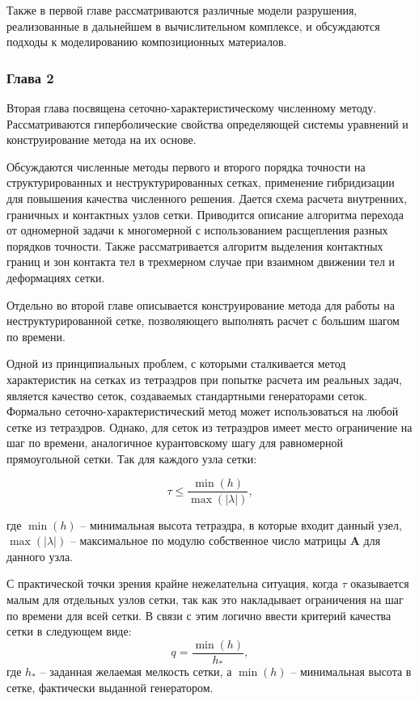 Также в первой главе рассматриваются различные модели разрушения, реализованные в дальнейшем в вычислительном комплексе, и обсуждаются подходы к моделированию композиционных материалов.

\subsubsection*{Глава 2}

Вторая глава посвящена сеточно-характеристическому численному методу. Рассматриваются гиперболические свойства определяющей системы уравнений и конструирование метода на их основе.

Обсуждаются численные методы первого и второго порядка точности на структурированных и неструктурированных сетках, применение гибридизации для повышения качества численного решения. Дается схема расчета внутренних, граничных и контактных узлов сетки. Приводится описание алгоритма перехода от одномерной задачи к многомерной с использованием расщепления разных порядков точности. Также рассматривается алгоритм выделения контактных границ и зон контакта тел в трехмерном случае при взаимном движении тел и деформациях сетки.

Отдельно во второй главе описывается конструирование метода для работы на неструктурированной сетке, позволяющего выполнять расчет с большим шагом по времени.

Одной из принципиальных проблем, с которыми сталкивается метод характеристик на сетках из тетраэдров при попытке расчета им реальных задач, является качество сеток, создаваемых стандартными генераторами сеток. Формально сеточно-характеристический метод может использоваться на любой сетке из тетраэдров. Однако, для сеток из тетраэдров имеет место ограничение на шаг по времени, аналогичное курантовскому шагу для равномерной прямоугольной сетки. Так для каждого узла сетки:

\begin{equation}
\tau \le \frac{\min(h)}{\max(|\lambda|)},
\end{equation}

где $\min(h)$ -- минимальная высота тетраэдра, в которые входит данный узел, $\max(|\lambda|)$ -- максимальное по модулю собственное число матрицы $\mathbf A$ для данного узла.

С практической точки зрения крайне нежелательна ситуация, когда $\tau$ оказывается малым для отдельных узлов сетки, так как это накладывает ограничения на шаг по времени для всей сетки. В связи с этим логично ввести критерий качества сетки в следующем виде:
\begin{equation}
q = \frac{\min(h)}{h_*},
\end{equation}
где $h_*$ -- заданная желаемая мелкость сетки, а $\min(h)$ -- минимальная высота в сетке, фактически выданной генератором.

